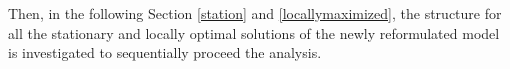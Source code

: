  Then, in the  following Section  \ref{station} and \ref{locallymaximized},
 the structure for all  the  stationary  and  locally optimal  solutions of 
 the newly reformulated model 
 is investigated  to  sequentially proceed the analysis.
%  
%  
%  
%  
%  
%
%
